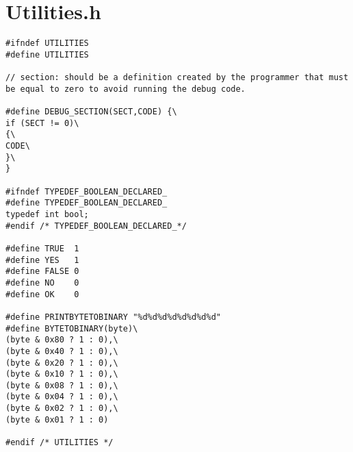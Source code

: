 \section{Utilities.h}
\label{UTILITIESH}

\begin{lstlisting}
#ifndef UTILITIES
#define UTILITIES

// section: should be a definition created by the programmer that must be equal to zero to avoid running the debug code.

#define DEBUG_SECTION(SECT,CODE) {\
if (SECT != 0)\
{\
CODE\
}\
}

#ifndef TYPEDEF_BOOLEAN_DECLARED_
#define TYPEDEF_BOOLEAN_DECLARED_
typedef int bool; 
#endif /* TYPEDEF_BOOLEAN_DECLARED_*/

#define TRUE  1
#define YES   1
#define FALSE 0
#define NO    0
#define OK    0

#define PRINTBYTETOBINARY "%d%d%d%d%d%d%d%d"
#define BYTETOBINARY(byte)\
(byte & 0x80 ? 1 : 0),\
(byte & 0x40 ? 1 : 0),\
(byte & 0x20 ? 1 : 0),\
(byte & 0x10 ? 1 : 0),\
(byte & 0x08 ? 1 : 0),\
(byte & 0x04 ? 1 : 0),\
(byte & 0x02 ? 1 : 0),\
(byte & 0x01 ? 1 : 0)

#endif /* UTILITIES */

\end{lstlisting}
